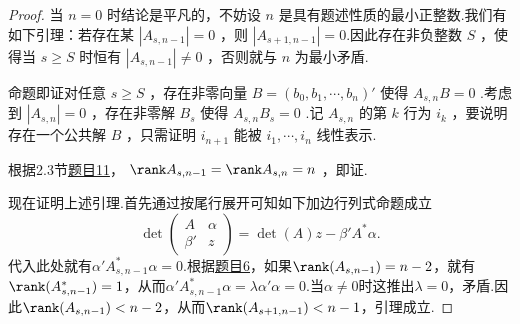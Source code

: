 \begin{proof}
	当 $n=0$ 时结论是平凡的，不妨设 $n$ 是具有题述性质的最小正整数.我们有如下引理：若存在某 $|A_{s,n-1}|=0	$ ，则 $|A_{s+1,n-1}|=0$.因此存在非负整数 $S$ ，使得当 $s\ge S$ 时恒有 $|A_{s,n-1}|\ne0$ ，否则就与 $n$ 为最小矛盾.

	命题即证对任意 $s\ge S$ ，存在非零向量 $B=(b_0,b_1,\cdots,b_n)'$ 使得 $A_{s,n}B=0$ .考虑到 $|A_{s,n}|=0$ ，存在非零解 $B_s$ 使得 $A_{s,n}B_s=0$ .记 $A_{s,n}$ 的第 $k$ 行为 $i_k$ ，要说明存在一个公共解 $B$ ，只需证明 $i_{n+1}$ 能被 $i_1,\cdots,i_n$ 线性表示.

	根据2.3节\hyperlink{SolveEquation}{题目11}， $\rank A_{s,n-1}=\rank A_{s,n}=n$ ，即证.

	现在证明上述引理.首先通过按尾行展开可知如下\hypertarget{DeterminantWithAddedRowAndColumn}{加边行列式}命题成立
	\[
		\det\begin{pmatrix}
			A      & \alpha \\
			\beta' & z
		\end{pmatrix}=\det(A)z-\beta'A^*\alpha.
	\]
	代入此处就有$\alpha'A^*_{s,n-1}\alpha=0$.根据\hyperlink{RankOfAdjoint}{题目6}，如果$\rank(A_{s,n-1})=n-2$，就有$\rank(A_{s,n-1}^*)=1$，从而$\alpha'A^*_{s,n-1}\alpha=\lambda\alpha'\alpha=0$.当$\alpha\ne0$时这推出$\lambda=0$，矛盾.因此$\rank(A_{s,n-1})<n-2$，从而$\rank(A_{s+1,n-1})<n-1$，引理成立.
\end{proof}
